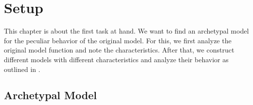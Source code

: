 \chapter{Setup}
\label{chap:setup}

This chapter is about the first task at hand.
We want to find an archetypal model for the peculiar behavior of the original model.
For this, we first analyze the original model function and note the characteristics.
After that, we construct different models with different characteristics and analyze their behavior as outlined in .




\section{Archetypal Model}



